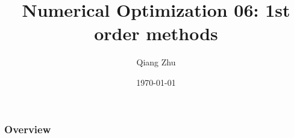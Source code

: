 \documentclass{beamer}
\title[Gradient Descent]{Numerical Optimization 06: 1st order methods} %
\author{Qiang Zhu} %
\institute[University of Nevada Las Vegas] %
{
University of Nevada Las Vegas\\ %
\medskip
}
\date{\today} %
\begin{document}
\begin{frame}
\titlepage %
\end{frame}

\begin{frame}
\frametitle{Overview} %
\tableofcontents %
\end{frame}


\end{document}
